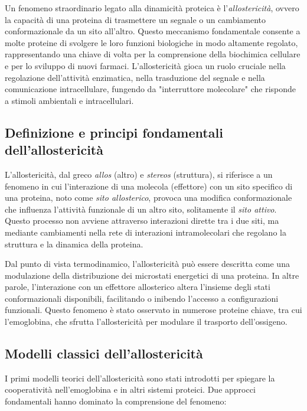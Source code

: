 \documentclass[Lau,binding=0.6cm,oneside,noexaminfo]{sapthesis}
\begin{document}
Un fenomeno straordinario legato alla dinamicità proteica è l’\emph{allostericità}, ovvero la capacità di una proteina di trasmettere un segnale o un cambiamento conformazionale da un sito all’altro. Questo meccanismo fondamentale consente a molte proteine di svolgere le loro funzioni biologiche in modo altamente regolato, rappresentando una chiave di volta per la comprensione della biochimica cellulare e per lo sviluppo di nuovi farmaci. L’allostericità gioca un ruolo cruciale nella regolazione dell’attività enzimatica, nella trasduzione del segnale e nella comunicazione intracellulare, fungendo da "interruttore molecolare" che risponde a stimoli ambientali e intracellulari.

\subsection*{Definizione e principi fondamentali dell’allostericità}
L’allostericità, dal greco \emph{allos} (altro) e \emph{stereos} (struttura), si riferisce a un fenomeno in cui l'interazione di una molecola (effettore) con un sito specifico di una proteina, noto come \emph{sito allosterico}, provoca una modifica conformazionale che influenza l'attività funzionale di un altro sito, solitamente il \emph{sito attivo}. Questo processo non avviene attraverso interazioni dirette tra i due siti, ma mediante cambiamenti nella rete di interazioni intramolecolari che regolano la struttura e la dinamica della proteina.

Dal punto di vista termodinamico, l’allostericità può essere descritta come una modulazione della distribuzione dei microstati energetici di una proteina. In altre parole, l’interazione con un effettore allosterico altera l’insieme degli stati conformazionali disponibili, facilitando o inibendo l’accesso a configurazioni funzionali. Questo fenomeno è stato osservato in numerose proteine chiave, tra cui l’emoglobina, che sfrutta l’allostericità per modulare il trasporto dell’ossigeno.

\subsection*{Modelli classici dell’allostericità}
I primi modelli teorici dell’allostericità sono stati introdotti per spiegare la cooperatività nell’emoglobina e in altri sistemi proteici. Due approcci fondamentali hanno dominato la comprensione del fenomeno:
\end{document}
